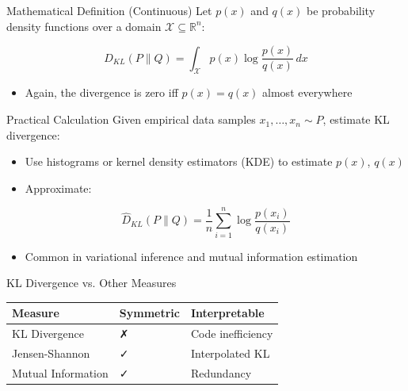 \documentclass[aspectratio=169]{beamer}
\begin{document}
\begin{frame}[label={sec:org26b62cf}]{Mathematical Definition (Continuous)}
Let \(p(x)\) and \(q(x)\) be probability density functions over a
domain \(\mathcal{X} \subseteq \mathbb{R}^n\):

\begin{equation}
D_{KL}(P \parallel Q) = \int_{\mathcal{X}} p(x) \log \frac{p(x)}{q(x)} \, dx
\end{equation}

\begin{itemize}
\item Again, the divergence is zero iff \(p(x) = q(x)\) almost everywhere
\end{itemize}
\end{frame}

\begin{frame}[label={sec:orge710ba3}]{Practical Calculation}
Given empirical data samples \(x_1, \dots, x_n \sim P\), estimate KL divergence:

\begin{itemize}
\item Use histograms or kernel density estimators (KDE) to estimate \(p(x)\), \(q(x)\)
\item Approximate:
\end{itemize}

\begin{equation}
\hat{D}_{KL}(P \parallel Q) = \frac{1}{n} \sum_{i=1}^n \log \frac{p(x_i)}{q(x_i)}
\end{equation}

\begin{itemize}
\item Common in variational inference and mutual information estimation
\end{itemize}
\end{frame}

\begin{frame}[label={sec:org5039c5c}]{KL Divergence vs. Other Measures}
\begin{center}
\begin{tabular}{lll}
Measure & Symmetric & Interpretable\\[0pt]
\hline
KL Divergence & ✗ & Code inefficiency\\[0pt]
Jensen-Shannon & ✓ & Interpolated KL\\[0pt]
Mutual Information & ✓ & Redundancy\\[0pt]
\end{tabular}
\end{center}
\end{frame}
\end{document}
